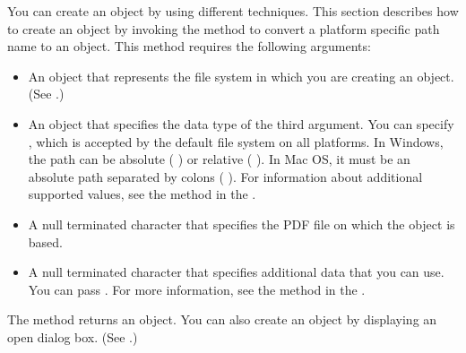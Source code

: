 \documentclass[letterpaper,12pt,english,openany,oneside]{sphinxmanual}
\begin{document}
You can create an  object by using different techniques. This section describes how to create an  object by invoking the  method to convert a platform specific path name to an  object. This method requires the following arguments:
\begin{itemize}
\item {} 
An  object that represents the file system in which you are creating an  object. (See .)

\item {} 
An  object that specifies the data type of the third argument. You can specify , which is accepted by the default file system on all platforms. In Windows, the path can be absolute ( ) or relative ( ). In Mac OS, it must be an absolute path separated by colons ( ). For information about additional supported values, see the  method in the .

\item {} 
A null\sphinxhyphen{} terminated character that specifies the PDF file on which the  object is based.

\item {} 
A null\sphinxhyphen{} terminated character that specifies additional data that you can use. You can pass . For more information, see the  method in the .

\end{itemize}

The  method returns an  object. You can also create an  object by displaying an open dialog box. (See .)
\end{document}
